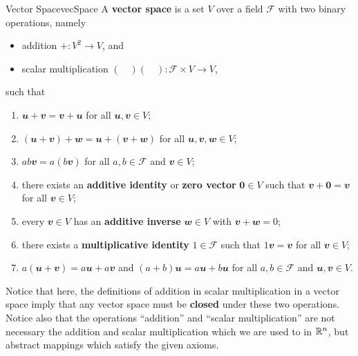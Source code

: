 \documentclass[math, code]{amznotes}
\theoremstyle{remark}
\newcommand{\zero}{\mathbf{0}}
\begin{document}
\begin{dfnbox}{Vector Space}{vecSpace}
    A {\color{red} \textbf{vector space}} is a set $V$ over a field $\mathcal{F}$ with two binary operations, namely 
    \begin{itemize}
        \item addition $+ \colon V^2 \to V$, and
        \item scalar multiplication $(\quad)(\quad) \colon \mathcal{F} \times V \to V$,
    \end{itemize}
    such that
    \begin{enumerate}
        \item $\mathbfit{u + v = v + u}$ for all $\mathbfit{u}, \mathbfit{v} \in V$;
        \item $\mathbfit{(u + v) + w = u + (v + w)}$ for all $\mathbfit{u, v, w} \in V$;
        \item $ab\mathbfit{v} = a(b\mathbfit{v})$ for all $a, b \in \mathcal{F}$ and $\mathbfit{v} \in V$;
        \item there exists an {\color{red} \textbf{additive identity}} or {\color{red} \textbf{zero vector}} $\zero \in V$ such that $\mathbfit{v} + \zero = \mathbfit{v}$ for all $\mathbfit{v} \in V$;
        \item every $\mathbfit{v} \in V$ has an {\color{red} \textbf{additive inverse}} $\mathbfit{w} \in V$ with $\mathbfit{v + w} = 0$;
        \item there exists a {\color{red} \textbf{multiplicative identity}} $1 \in \mathcal{F}$ such that $1\mathbfit{v} = \mathbfit{v}$ for all $\mathbfit{v} \in V$;
        \item $a\mathbfit{(u + v)} = a\mathbfit{u} + a\mathbfit{v}$ and $(a + b)\mathbfit{u} = a\mathbfit{u} + b\mathbfit{u}$ for all $a, b \in \mathcal{F}$ and $\mathbfit{u, v} \in V$.
    \end{enumerate}
\end{dfnbox}
Notice that here, the definitions of addition in scalar multiplication in a vector space imply that any vector space must be \textbf{closed} under these two operations. Notice also that the operations ``addition'' and ``scalar multiplication'' are not necessary the addition and scalar multiplication which we are used to in $\mathbb{R}^n$, but abstract mappings which satisfy the given axioms.
\end{document}
